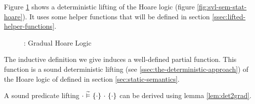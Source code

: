 Figure \ref{fig:gvl-sem-stat-hoare} shows a deterministic lifting of the Hoare logic (figure \ref{fig:svl-sem-stat-hoare}).
It uses some helper functions that will be defined in section \ref{ssec:lifted-helper-functions}.
\begin{figure}[h!]
    
    \caption{\gvl: Gradual Hoare Logic} 
    \label{fig:gvl-sem-stat-hoare}
\end{figure}

\begin{lemma}
    The inductive definition we give induces a well-defined partial function.
    This function is a sound deterministic lifting (see \ref{ssec:the-deterministic-approach}) of the Hoare logic of \svlidf defined in section \ref{sec:static-semantics}.
\end{lemma}

A sound predicate lifting ${\cdot} \,\,\widetilde{\vDash}\,\, \{{\cdot}\} ~{\cdot}~ \{{\cdot}\}$ can be derived using lemma \ref{lem:det2grad}.
